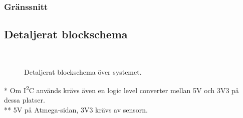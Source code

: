 \documentclass[a4paper,11pt]{article}
\begin{document}
\subsection{Gränssnitt} \label{ssec:PCInterface}

\newpage
\begin{appendices}
\chapter{Detaljerat blockschema}
\\%
\begin{figure}[h!]
    \caption{Detaljerat blockschema över systemet.}
    \label{fig:modulesDetailed}
\end{figure}
* Om I\textsuperscript{2}C används krävs även en logic level converter mellan 5V och 3V3 på dessa platser.\\
** 5V på Atmega-sidan, 3V3 krävs av sensorn.

\end{appendices}
\end{document}
